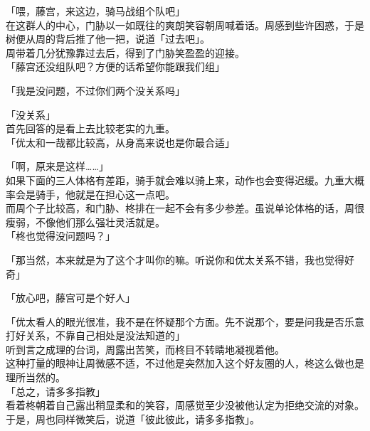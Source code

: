 「喂，藤宫，来这边，骑马战组个队吧」\\

在这群人的中心，门胁以一如既往的爽朗笑容朝周喊着话。周感到些许困惑，于是树便从周的背后推了他一把，说道「过去吧」。\\

周带着几分犹豫靠过去后，得到了门胁笑盈盈的迎接。\\

「藤宫还没组队吧？方便的话希望你能跟我们组」

「我是没问题，不过你们两个没关系吗」

「没关系」\\

首先回答的是看上去比较老实的九重。\\

「优太和一哉都比较高，从身高来说也是你最合适」

「啊，原来是这样……」\\

如果下面的三人体格有差距，骑手就会难以骑上来，动作也会变得迟缓。九重大概率会是骑手，他就是在担心这一点吧。\\

而周个子比较高，和门胁、柊排在一起不会有多少参差。虽说单论体格的话，周很瘦弱，不像他们那么强壮灵活就是。\\

「柊也觉得没问题吗？」

「那当然，本来就是为了这个才叫你的嘛。听说你和优太关系不错，我也觉得好奇」

「放心吧，藤宫可是个好人」

「优太看人的眼光很准，我不是在怀疑那个方面。先不说那个，要是问我是否乐意打好关系，不靠自己相处是没法知道的」\\

听到言之成理的台词，周露出苦笑，而柊目不转睛地凝视着他。\\

这种打量的眼神让周微感不适，不过他是突然加入这个好友圈的人，柊这么做也是理所当然的。\\

「总之，请多多指教」\\

看着柊朝着自己露出稍显柔和的笑容，周感觉至少没被他认定为拒绝交流的对象。于是，周也同样微笑后，说道「彼此彼此，请多多指教」。
